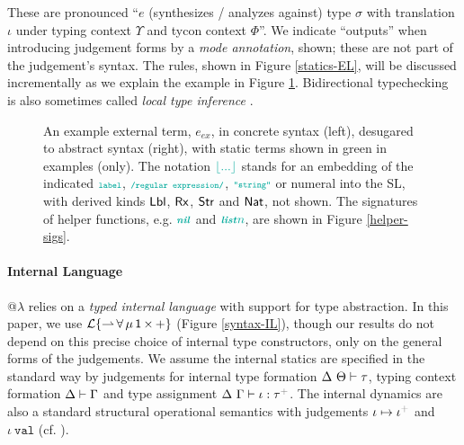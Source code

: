 \documentclass[9pt,preprint]{sigplanconf}
\newcommand{\moutput}{^{\color{gray}{+}}}
\begin{document}
These are pronounced ``$e$ (synthesizes / analyzes against) type $\sigma$ with translation $\iota$ under typing context $\Upsilon$ and tycon context $\Phi$''. We indicate ``outputs'' when introducing judgement forms by a \emph{mode annotation}, shown; these are not part of the judgement's syntax. The rules, shown in Figure \ref{statics-EL}, will be discussed incrementally as we explain the example in Figure \ref{example}.  Bidirectional typechecking is also sometimes called \emph{local type inference} \cite{Pierce:2000:LTI:345099.345100}. %
 \begin{figure*}[t!]
\small
\hspace{-5px}
\caption{An example external term, $e_{ex}$, in concrete syntax (left), desugared to abstract syntax (right), with static terms shown in green in examples (only). The notation ${\small \scolor{\desugar{...}}}$ stands for an embedding of the indicated ${\small \scolor{\conclbl{label}}}$, ${\small \scolor{\concrx{regular expression}}}$, ${\small \scolor{\concstr{string}}}$ or numeral into the SL, with derived kinds  ${\sf Lbl}$, ${\sf Rx}$,  ${\sf Str}$ and ${\sf Nat}$, not shown. The signatures of helper functions, e.g. ${\small \scolor{\svar{nil}}}$ and ${\small \scolor{\svar{list}n}}$, are shown in Figure \ref{helper-sigs}.}
\label{example}
\end{figure*}


\paragraph{Internal Language} @$\lambda$ relies on a \emph{typed internal language} with support for type abstraction. In this paper, we use {$\mathcal{L}\{{\rightharpoonup}\,{\forall}\,{\mu}\,{{\sf 1}}\,{\times}\,{+}\}$} (Figure \ref{syntax-IL}), though our results do not depend on this precise choice of internal type constructors, only on the general forms of the judgements. We assume the internal statics are specified in the standard way by judgements for internal type formation {$\Delta~\Theta \vdash \tau$}, typing context formation { $\Delta \vdash \Gamma$} and type assignment {$\iDelta~\iGamma \vdash \iota : \tau\moutput$}. The internal dynamics are also a standard structural operational semantics with judgements {\small $\iota \mapsto \iota\moutput$} and {$\iota~\mathtt{val}$} (cf. \cite{pfpl}). 
\end{document}
